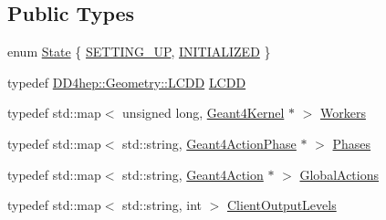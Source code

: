 \subsection*{Public Types}
\begin{DoxyCompactItemize}
\item 
enum \hyperlink{class_d_d4hep_1_1_simulation_1_1_geant4_kernel_ab0de90f94bc8898e60c2ca6cef292d92}{State} \{ \hyperlink{class_d_d4hep_1_1_simulation_1_1_geant4_kernel_ab0de90f94bc8898e60c2ca6cef292d92ad9e96c644ab9e3980c3c72ffb02cdefc}{S\+E\+T\+T\+I\+N\+G\+\_\+\+UP}, 
\hyperlink{class_d_d4hep_1_1_simulation_1_1_geant4_kernel_ab0de90f94bc8898e60c2ca6cef292d92a0d9e793dd29116f95a10525a25f9701a}{I\+N\+I\+T\+I\+A\+L\+I\+Z\+ED}
 \}
\item 
typedef \hyperlink{class_d_d4hep_1_1_geometry_1_1_l_c_d_d}{D\+D4hep\+::\+Geometry\+::\+L\+C\+DD} \hyperlink{class_d_d4hep_1_1_simulation_1_1_geant4_kernel_a190e652b62ebce3db3372c4265ffa5a3}{L\+C\+DD}
\item 
typedef std\+::map$<$ unsigned long, \hyperlink{class_d_d4hep_1_1_simulation_1_1_geant4_kernel}{Geant4\+Kernel} $\ast$ $>$ \hyperlink{class_d_d4hep_1_1_simulation_1_1_geant4_kernel_ae9fdf26cda88a6f822f060558e85d797}{Workers}
\item 
typedef std\+::map$<$ std\+::string, \hyperlink{class_d_d4hep_1_1_simulation_1_1_geant4_action_phase}{Geant4\+Action\+Phase} $\ast$ $>$ \hyperlink{class_d_d4hep_1_1_simulation_1_1_geant4_kernel_ae28985781d4226ece4c3fffe8827b400}{Phases}
\item 
typedef std\+::map$<$ std\+::string, \hyperlink{class_d_d4hep_1_1_simulation_1_1_geant4_action}{Geant4\+Action} $\ast$ $>$ \hyperlink{class_d_d4hep_1_1_simulation_1_1_geant4_kernel_a9cd070dfd06f049aa11b56688faaa643}{Global\+Actions}
\item 
typedef std\+::map$<$ std\+::string, int $>$ \hyperlink{class_d_d4hep_1_1_simulation_1_1_geant4_kernel_a259066f5e9a56bdbfc9718a2b42b8b06}{Client\+Output\+Levels}
\end{DoxyCompactItemize}
